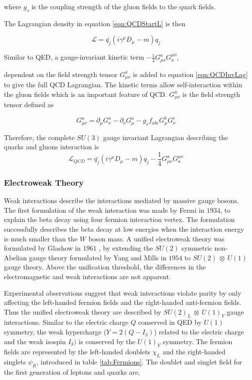 where $g_{s}$ is the coupling strength of the gluon fields to the quark fields.

The Lagrangian density in equation \ref{eqn:QCDStartL} is then 

\begin{equation}
\mathcal{L} = \bar{q_{j}}(i\gamma^{\mu}D_{\mu} - m )q_{j}
\label{eqn:QCDInvLag}
\end{equation}

Similar to QED, a gauge-invariant kinetic term 
$-\frac{1}{4}G^{a}_{\mu\nu}G^{\mu\nu}_{a}$, 

dependent on the field strength tensor $G^{a}_{\mu\nu}$ is added to equation \ref{eqn:QCDInvLag} to give the full QCD Lagrangian. The kinetic terms allow self-interaction within the gluon fields which is an important feature of QCD. $G^{a}_{\mu\nu}$ is the field strength tensor defined as

\begin{equation}
G^{a}_{\mu\nu} = \partial_{\mu}G^{a}_{\nu} - \partial_{\nu}G^{a}_{\mu} - g_{s}f_{abc}G^{b}_{\mu}G^{c}_{\nu}
\label{eqn:QCDFullLag}
\end{equation}

Therefore, the complete $SU(3)$ gauge invariant Lagrangian describing the quarks and gluons interaction is
\begin{equation}
\mathcal{L}_{QCD} = \bar{q_{j}}(i\gamma^{\mu}D_{\mu} - m )q_{j} -\frac{1}{4}G^{a}_{\mu\nu}G^{\mu\nu}_{a} 
\label{eqn:QCDCompleteLag}
\end{equation}

\subsubsection{Electroweak Theory}
\label{subsubsec:EWkUni}
Weak interactions describe the interactions mediated by massive gauge bosons. The first formulation of the weak interaction was made by Fermi in $1934$, to explain the beta decay using four fermion interaction vertex. The formulation successfully describes the beta decay at low energies when the interaction energy is much smaller than the $W$ boson mass. A unified electroweak theory was formulated by Glashow in $1961$ \cite{GLASHOW1961579}, by extending the $SU(2)$ symmetric non-Abelian gauge theory formulated by Yang and Mills in $1954$ \cite{PhysRev.96.191} to $SU(2)~\otimes~U(1)$ gauge theory. Above the unification threshold, the differences in the electromagnetic and weak interactions are not apparent.

Experimental observations suggest that weak interactions violate parity by only affecting the left-handed fermion fields and the right-handed anti-fermion fields. Thus the unified electroweak theory are described by $SU(2)_{L}~\otimes~U(1)_{Y}$ gauge interactions. Similar to the electric charge $Q$ conserved in QED by $U(1)$ symmetry, the weak hypercharge ($Y=2(Q-I_{3})$) related to the electric charge and the weak isospin $I_{3})$ is conserved by the $U(1)_{Y}$ symmetry. The fermion fields are represented by the left-handed doublets $\chi_{L}$ and the right-handed singlets $\psi_{R}$, introduced in table \ref{tab:Fermions}. The doublet and singlet field for the first generation of leptons and quarks are, 


